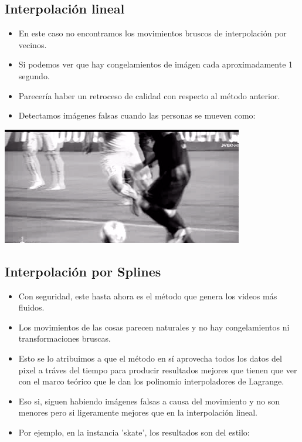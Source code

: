 \subsection{Interpolación lineal}

\begin{itemize}
\item En este caso no encontramos los movimientos bruscos de interpolación por vecinos.
\item Si podemos ver que hay congelamientos de imágen cada aproximadamente 1 segundo.
\item Parecería haber un retroceso de calidad con respecto al método anterior.
\item Detectamos imágenes falsas cuando las personas se mueven como:
\end{itemize}

\includegraphics[scale=1]{imagenes/art1.png}

\subsection{Interpolación por Splines}

\begin{itemize}
\item Con seguridad, este hasta ahora es el método que genera los videos más fluidos.
\item Los movimientos de las cosas parecen naturales y no hay congelamientos ni transformaciones bruscas.
\item Esto se lo atribuimos a que el método en sí aprovecha todos los datos del pixel a tráves del tiempo para producir resultados mejores que tienen que ver con el marco teórico que le dan los polinomio interpoladores de Lagrange.
\item Eso si, siguen habiendo imágenes falsas a causa del movimiento y no son menores pero si ligeramente mejores que en la interpolación lineal.
\item Por ejemplo, en la instancia 'skate', los resultados son del estilo:
\end{itemize}

